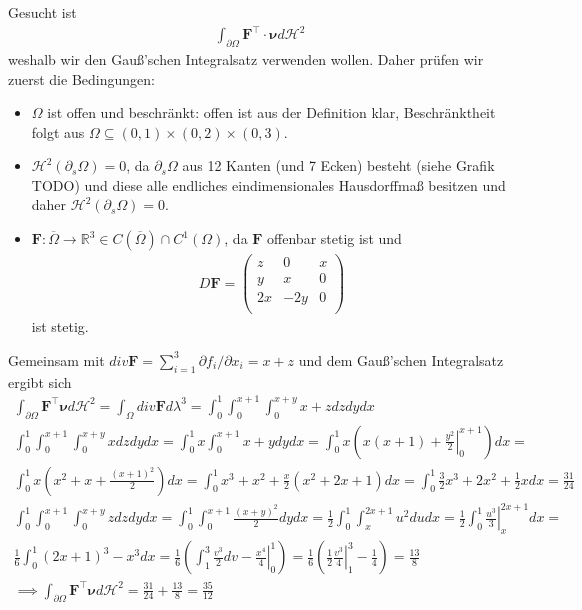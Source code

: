 \documentclass[]{article}
\begin{document}
Gesucht ist
\begin{align*}
	\int_{\partial \Omega} \bm{F}^\top \cdot \bm{\nu} d\mathcal{H}^2
\end{align*}
weshalb wir den Gauß'schen Integralsatz verwenden wollen. Daher prüfen wir zuerst die Bedingungen:
\begin{itemize}
	\item $\Omega$ ist offen und beschränkt: offen ist aus der Definition klar, Beschränktheit folgt aus $\Omega \subseteq (0,1)\times(0,2)\times(0,3)$.
	\item $\mathcal{H}^2(\partial_s\Omega) = 0$, da $\partial_s\Omega$ aus 12 Kanten (und 7 Ecken) besteht (siehe Grafik TODO) und diese alle endliches eindimensionales Hausdorffmaß besitzen und daher $\mathcal{H}^2(\partial_s\Omega) = 0$.
	\item $\bm{F}:\overline{\Omega} \rightarrow \mathbb{R}^3 \in C(\overline{\Omega}) \cap C^1(\Omega)$, da $\bm{F}$ offenbar stetig ist und
	\begin{align*}
		D\bm{F} = \begin{pmatrix}
			z & 0 & x\\ y & x & 0\\ 2x & -2y & 0\\
		\end{pmatrix}
	\end{align*}
	ist stetig.
\end{itemize}

Gemeinsam mit $div\bm{F} = \sum_{i=1}^{3} \partial f_i / \partial x_i = x+z$ und dem Gauß'schen Integralsatz ergibt sich
\begin{align*}
	\int_{\partial\Omega} \bm{F}^\top \bm{\nu} d\mathcal{H}^2 = \int_\Omega div\bm{F} d\lambda^3 = \int_0^1 \int_0^{x+1} \int_0^{x+y} x+z dzdydx\\
	\int_0^1 \int_0^{x+1} \int_0^{x+y} x dzdydx = \int_0^1 x \int_0^{x+1} x+y dy dx = \int_0^1 x\left(x(x+1) + \left.\frac{y^2}{2}\right\vert_0^{x+1}\right) dx =\\
	\int_0^1 x \left(x^2+x + \frac{(x+1)^2}{2}\right) dx = \int_0^1 x^3 + x^2 + \frac{x}{2} (x^2+2x+1) dx = \int_0^1 \frac{3}{2} x^3 + 2 x^2 + \frac{1}{2} x dx = \frac{31}{24}\\
	\int_0^1 \int_0^{x+1} \int_0^{x+y} z dzdydx = \int_0^1 \int_0^{x+1} \frac{(x+y)^2}{2} dy dx = \frac{1}{2} \int_0^1 \int_x^{2x+1} u^2 du dx = \frac{1}{2} \int_0^1 \left.\frac{u^3}{3}\right\vert_x^{2x+1} dx =\\
	\frac{1}{6} \int_0^1 (2x+1)^3 - x^3 dx = \frac{1}{6} \left(\int_1^3 \frac{v^3}{2} dv - \left. \frac{x^4}{4}\right\vert_0^1\right) = \frac{1}{6} \left(\frac{1}{2} \left.\frac{v^3}{4}\right\vert_1^3 - \frac{1}{4}\right) = \frac{13}{8}\\
	\implies \int_{\partial\Omega} \bm{F}^\top \bm{\nu} d\mathcal{H}^2 = \frac{31}{24} + \frac{13}{8} = \frac{35}{12}
\end{align*}
\newpage
\end{document}
